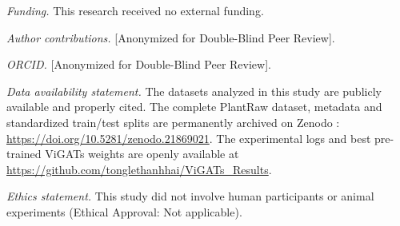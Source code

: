\documentclass[]{interact}
\theoremstyle{plain}
\theoremstyle{definition}
\theoremstyle{remark}
\begin{document}
\textit{Funding.} This research received no external funding.

\textit{Author contributions.} [Anonymized for Double-Blind Peer Review].

\textit{ORCID.} [Anonymized for Double-Blind Peer Review].

\textit{Data availability statement.} The datasets analyzed in this study are publicly available and properly cited. The complete PlantRaw dataset, metadata and standardized train/test splits are permanently archived on Zenodo \citep{tongle2026plantraw}: \url{https://doi.org/10.5281/zenodo.21869021}. The experimental logs and best pre-trained ViGATs weights are openly available at \url{https://github.com/tonglethanhhai/ViGATs_Results}.

\textit{Ethics statement.} This study did not involve human participants or animal experiments (Ethical Approval: Not applicable).
\end{document}

